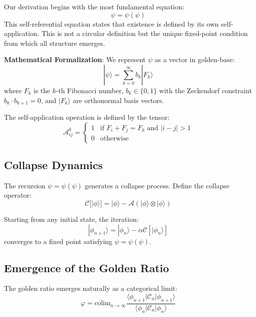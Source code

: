 \documentclass[%
 reprint,
 amsmath,amssymb,
 aps,
 prd,
 nofootinbib,      %
 longbibliography  %
]{revtex4-2}
\begin{document}
Our derivation begins with the most fundamental equation:
\begin{equation}
\psi = \psi(\psi)
\label{eq:primordial}
\end{equation}
This self-referential equation states that existence is defined by its own self-application. 
This is not a circular definition but the unique fixed-point condition from which all structure emerges.

\textbf{Mathematical Formalization}: We represent $\psi$ as a vector in golden-base:
\begin{equation}
|\psi\rangle = \sum_{k=0}^{\infty} b_k |F_k\rangle
\end{equation}
where $F_k$ is the $k$-th Fibonacci number, $b_k \in \{0, 1\}$ with the Zeckendorf constraint $b_k \cdot b_{k+1} = 0$, and $|F_k\rangle$ are orthonormal basis vectors.

The self-application operation is defined by the tensor:
\begin{equation}
\mathcal{A}_{ij}^k = \begin{cases}
1 & \text{if } F_i + F_j = F_k \text{ and } |i-j| > 1 \\
0 & \text{otherwise}
\end{cases}
\end{equation}

\subsection{Collapse Dynamics}

The recursion $\psi = \psi(\psi)$ generates a collapse process. Define the collapse operator:
\begin{equation}
\mathcal{C}[|\phi\rangle] = |\phi\rangle - \mathcal{A}(|\phi\rangle \otimes |\phi\rangle)
\end{equation}

Starting from any initial state, the iteration:
\begin{equation}
|\phi_{n+1}\rangle = |\phi_n\rangle - \alpha \mathcal{C}[|\phi_n\rangle]
\end{equation}
converges to a fixed point satisfying $\psi = \psi(\psi)$.

\subsection{Emergence of the Golden Ratio}

The golden ratio emerges naturally as a categorical limit:
\begin{equation}
\varphi = \text{colim}_{n \to \infty} \frac{\langle\phi_{n+1}|\mathcal{C}_n|\phi_{n+1}\rangle}{\langle\phi_n|\mathcal{C}_n|\phi_n\rangle}
\end{equation}
\end{document}
